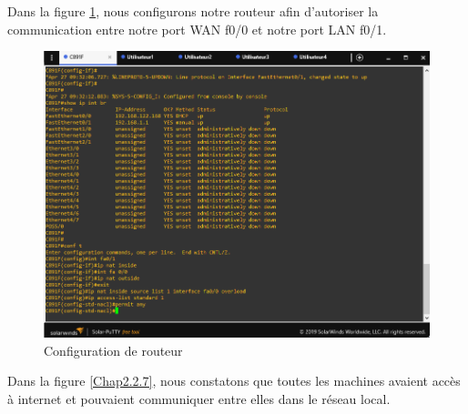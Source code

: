 Dans la figure \ref{Chap2.2.6}, nous configurons notre routeur afin d'autoriser la communication entre notre port WAN f0/0 et notre port LAN f0/1.


\begin{figure}[H]
 \centering
    \includegraphics[width=16cm]{Images/BRades-Topologie6.png}
    \caption{Configuration de routeur}
    \label{Chap2.2.6}
\end{figure}


Dans la figure \ref{Chap2.2.7}, nous constatons que toutes les machines avaient accès à internet et pouvaient communiquer entre elles dans le réseau local.

